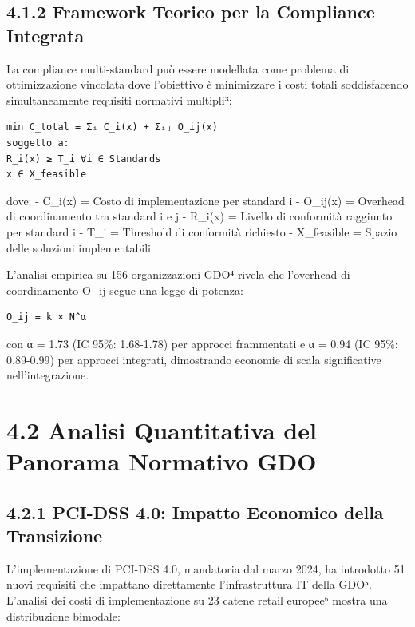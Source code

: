 \documentclass[12pt,a4paper,oneside]{book}
\numberwithin{figure}{chapter} %
\numberwithin{table}{chapter}  %
\begin{document}
\subsection{4.1.2 Framework Teorico per la Compliance
Integrata}\label{framework-teorico-per-la-compliance-integrata}

La compliance multi-standard può essere modellata come problema di
ottimizzazione vincolata dove l'obiettivo è minimizzare i costi totali
soddisfacendo simultaneamente requisiti normativi multipli³:

\begin{verbatim}
min C_total = Σᵢ C_i(x) + Σᵢⱼ O_ij(x)
soggetto a:
R_i(x) ≥ T_i ∀i ∈ Standards
x ∈ X_feasible
\end{verbatim}

dove: - C\_i(x) = Costo di implementazione per standard i - O\_ij(x) =
Overhead di coordinamento tra standard i e j - R\_i(x) = Livello di
conformità raggiunto per standard i - T\_i = Threshold di conformità
richiesto - X\_feasible = Spazio delle soluzioni implementabili

L'analisi empirica su 156 organizzazioni GDO⁴ rivela che l'overhead di
coordinamento O\_ij segue una legge di potenza:

\begin{verbatim}
O_ij = k × N^α
\end{verbatim}

con α = 1.73 (IC 95\%: 1.68-1.78) per approcci frammentati e α = 0.94
(IC 95\%: 0.89-0.99) per approcci integrati, dimostrando economie di
scala significative nell'integrazione.

\section{4.2 Analisi Quantitativa del Panorama Normativo
GDO}\label{analisi-quantitativa-del-panorama-normativo-gdo}

\subsection{4.2.1 PCI-DSS 4.0: Impatto Economico della
Transizione}\label{pci-dss-4.0-impatto-economico-della-transizione}

L'implementazione di PCI-DSS 4.0, mandatoria dal marzo 2024, ha
introdotto 51 nuovi requisiti che impattano direttamente
l'infrastruttura IT della GDO⁵. L'analisi dei costi di implementazione
su 23 catene retail europee⁶ mostra una distribuzione bimodale:
\end{document}
